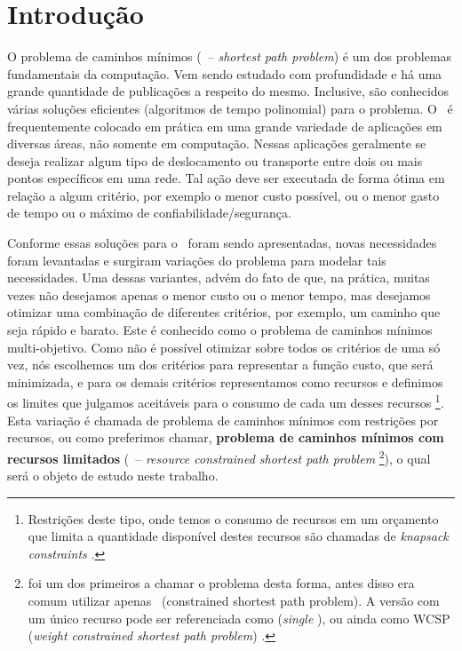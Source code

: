 \chapter{Introdução}
\label{cap:introducao}

O problema de caminhos mínimos (\spp~-- \emph{shortest path problem}) é 
um dos problemas fundamentais da computação. Vem sendo estudado com 
profundidade e há uma grande quantidade de publicações a respeito do 
mesmo. Inclusive, são conhecidos várias soluções eficientes (algoritmos 
de tempo polinomial) para o problema. O \spp~é frequentemente colocado 
em prática em uma grande variedade de aplicações em diversas áreas, não 
somente em computação. Nessas aplicações geralmente se deseja realizar 
algum tipo de deslocamento ou transporte entre dois ou mais pontos 
específicos em uma rede. Tal ação deve ser executada de forma ótima em 
relação a algum critério, por exemplo o menor custo possível, ou o menor 
gasto de tempo ou o máximo de confiabilidade/segurança.

Conforme essas soluções para o \spp~foram sendo apresentadas, novas 
necessidades foram levantadas e surgiram variações do problema para 
modelar tais necessidades. Uma dessas variantes, advém do fato de que, 
na prática, muitas vezes não desejamos apenas o menor custo ou o menor 
tempo, mas desejamos otimizar uma combinação de diferentes critérios, 
por exemplo, um caminho que seja rápido e barato. Este é conhecido como 
o problema de caminhos mínimos multi-objetivo. Como não é possível 
otimizar sobre todos os critérios de uma só vez, nós escolhemos um dos 
critérios para representar a função custo, que será minimizada, e para 
os demais critérios representamos como recursos e definimos os limites 
que julgamos aceitáveis para o consumo de cada um desses recursos 
\footnote{Restrições deste tipo, onde temos o consumo de recursos em um 
  orçamento que limita a quantidade disponível destes recursos são 
chamadas de \emph{knapsack constraints} \citep{bordorfer:09}.}.  Esta 
variação é chamada de problema de caminhos mínimos com restrições por 
recursos, ou como preferimos chamar, {\bf problema de caminhos mínimos 
com recursos limitados} (\rcsp~-- \emph{resource constrained shortest 
path problem} \footnote{\citet{beasley:89} foi um dos primeiros a chamar 
  o problema desta forma, antes disso era comum utilizar apenas 
  \csp~(constrained shortest path problem). A versão com um único 
  recurso pode ser referenciada como \srcsp (\emph{single} \rcsp), ou 
  ainda como \textsc{WCSP} (\emph{weight constrained shortest path 
problem}) \citep{dumitrescu:03}.}), o qual será o objeto de estudo neste 
trabalho.


